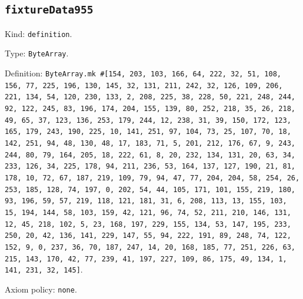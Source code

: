 \documentclass[11pt]{article}
\begin{document}
\subsection*{\texttt{fixtureData955}}
\noindent Kind: \texttt{definition}.\par
\noindent Type: \texttt{ByteArray}.\par
\noindent Definition: \texttt{ByteArray.mk \#[154, 203, 103, 166, 64, 222, 32, 51, 108, 156, 77, 225, 196, 130, 145, 32, 131, 211, 242, 32, 126, 109, 206, 221, 134, 54, 120, 230, 133, 2, 208, 225, 38, 228, 50, 221, 248, 244, 92, 122, 245, 83, 196, 174, 204, 155, 139, 80, 252, 218, 35, 26, 218, 49, 65, 37, 123, 136, 253, 179, 244, 12, 238, 31, 39, 150, 172, 123, 165, 179, 243, 190, 225, 10, 141, 251, 97, 104, 73, 25, 107, 70, 18, 142, 251, 94, 48, 130, 48, 17, 183, 71, 5, 201, 212, 176, 67, 9, 243, 244, 80, 79, 164, 205, 18, 222, 61, 8, 20, 232, 134, 131, 20, 63, 34, 233, 126, 34, 225, 178, 94, 211, 236, 53, 164, 137, 127, 190, 21, 81, 178, 10, 72, 67, 187, 219, 109, 79, 94, 47, 77, 204, 204, 58, 254, 26, 253, 185, 128, 74, 197, 0, 202, 54, 44, 105, 171, 101, 155, 219, 180, 93, 196, 59, 57, 219, 118, 121, 181, 31, 6, 208, 113, 13, 155, 103, 15, 194, 144, 58, 103, 159, 42, 121, 96, 74, 52, 211, 210, 146, 131, 12, 45, 218, 102, 5, 23, 168, 197, 229, 155, 134, 53, 147, 195, 233, 250, 20, 42, 136, 141, 229, 147, 55, 94, 222, 191, 89, 248, 74, 122, 152, 9, 0, 237, 36, 70, 187, 247, 14, 20, 168, 185, 77, 251, 226, 63, 215, 143, 170, 42, 77, 239, 41, 197, 227, 109, 86, 175, 49, 134, 1, 141, 231, 32, 145]}.\par
\noindent Axiom policy: \texttt{none}.\par
\end{document}
